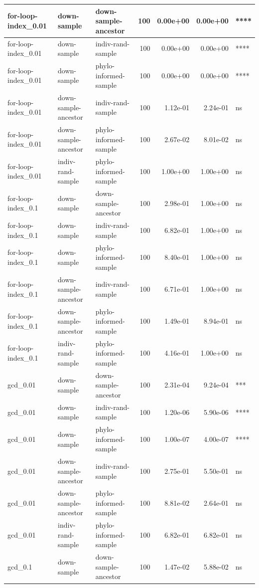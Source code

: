 \documentclass[
]{book}
\begin{document}
\begin{table}
\begin{tabular}[t]{l|l|l|r|r|r|l}
\hline
for-loop-index\_0.01 & down-sample & down-sample-ancestor & 100 & 0.00e+00 & 0.00e+00 & ****\\
\hline
for-loop-index\_0.01 & down-sample & indiv-rand-sample & 100 & 0.00e+00 & 0.00e+00 & ****\\
\hline
for-loop-index\_0.01 & down-sample & phylo-informed-sample & 100 & 0.00e+00 & 0.00e+00 & ****\\
\hline
for-loop-index\_0.01 & down-sample-ancestor & indiv-rand-sample & 100 & 1.12e-01 & 2.24e-01 & ns\\
\hline
for-loop-index\_0.01 & down-sample-ancestor & phylo-informed-sample & 100 & 2.67e-02 & 8.01e-02 & ns\\
\hline
for-loop-index\_0.01 & indiv-rand-sample & phylo-informed-sample & 100 & 1.00e+00 & 1.00e+00 & ns\\
\hline
for-loop-index\_0.1 & down-sample & down-sample-ancestor & 100 & 2.98e-01 & 1.00e+00 & ns\\
\hline
for-loop-index\_0.1 & down-sample & indiv-rand-sample & 100 & 6.82e-01 & 1.00e+00 & ns\\
\hline
for-loop-index\_0.1 & down-sample & phylo-informed-sample & 100 & 8.40e-01 & 1.00e+00 & ns\\
\hline
for-loop-index\_0.1 & down-sample-ancestor & indiv-rand-sample & 100 & 6.71e-01 & 1.00e+00 & ns\\
\hline
for-loop-index\_0.1 & down-sample-ancestor & phylo-informed-sample & 100 & 1.49e-01 & 8.94e-01 & ns\\
\hline
for-loop-index\_0.1 & indiv-rand-sample & phylo-informed-sample & 100 & 4.16e-01 & 1.00e+00 & ns\\
\hline
gcd\_0.01 & down-sample & down-sample-ancestor & 100 & 2.31e-04 & 9.24e-04 & ***\\
\hline
gcd\_0.01 & down-sample & indiv-rand-sample & 100 & 1.20e-06 & 5.90e-06 & ****\\
\hline
gcd\_0.01 & down-sample & phylo-informed-sample & 100 & 1.00e-07 & 4.00e-07 & ****\\
\hline
gcd\_0.01 & down-sample-ancestor & indiv-rand-sample & 100 & 2.75e-01 & 5.50e-01 & ns\\
\hline
gcd\_0.01 & down-sample-ancestor & phylo-informed-sample & 100 & 8.81e-02 & 2.64e-01 & ns\\
\hline
gcd\_0.01 & indiv-rand-sample & phylo-informed-sample & 100 & 6.82e-01 & 6.82e-01 & ns\\
\hline
gcd\_0.1 & down-sample & down-sample-ancestor & 100 & 1.47e-02 & 5.88e-02 & ns\\

\end{tabular}
\end{table}
\end{document}

